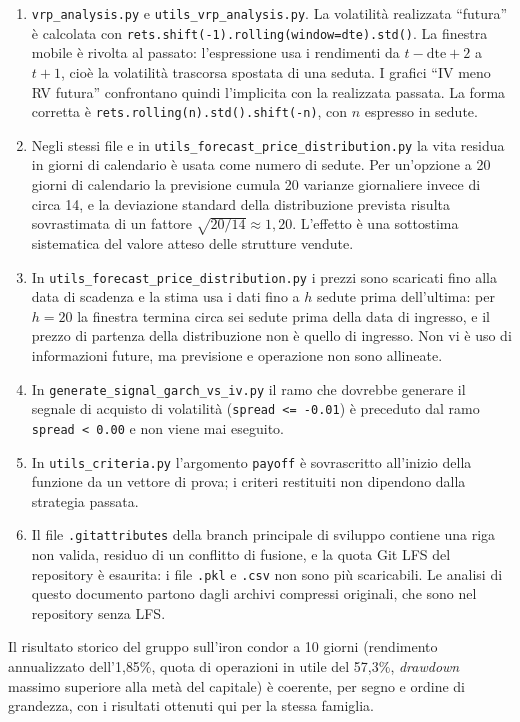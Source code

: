 \documentclass[11pt,a4paper]{article}
\begin{document}
\begin{enumerate}
\item \texttt{vrp\_analysis.py} e \texttt{utils\_vrp\_analysis.py}. La volatilità realizzata ``futura'' è calcolata con \texttt{rets.shift(-1).rolling(window=dte).std()}. La finestra mobile è rivolta al passato: l'espressione usa i rendimenti da $t-\mathrm{dte}+2$ a $t+1$, cioè la volatilità trascorsa spostata di una seduta. I grafici ``IV meno RV futura'' confrontano quindi l'implicita con la realizzata passata. La forma corretta è \texttt{rets.rolling(n).std().shift(-n)}, con $n$ espresso in sedute.
\item Negli stessi file e in \texttt{utils\_forecast\_price\_distribution.py} la vita residua in giorni di calendario è usata come numero di sedute. Per un'opzione a 20 giorni di calendario la previsione cumula 20 varianze giornaliere invece di circa 14, e la deviazione standard della distribuzione prevista risulta sovrastimata di un fattore $\sqrt{20/14}\approx 1{,}20$. L'effetto è una sottostima sistematica del valore atteso delle strutture vendute.
\item In \texttt{utils\_forecast\_price\_distribution.py} i prezzi sono scaricati fino alla data di scadenza e la stima usa i dati fino a $h$ sedute prima dell'ultima: per $h=20$ la finestra termina circa sei sedute prima della data di ingresso, e il prezzo di partenza della distribuzione non è quello di ingresso. Non vi è uso di informazioni future, ma previsione e operazione non sono allineate.
\item In \texttt{generate\_signal\_garch\_vs\_iv.py} il ramo che dovrebbe generare il segnale di acquisto di volatilità (\texttt{spread <= -0.01}) è preceduto dal ramo \texttt{spread < 0.00} e non viene mai eseguito.
\item In \texttt{utils\_criteria.py} l'argomento \texttt{payoff} è sovrascritto all'inizio della funzione da un vettore di prova; i criteri restituiti non dipendono dalla strategia passata.
\item Il file \texttt{.gitattributes} della branch principale di sviluppo contiene una riga non valida, residuo di un conflitto di fusione, e la quota Git LFS del repository è esaurita: i file \texttt{.pkl} e \texttt{.csv} non sono più scaricabili. Le analisi di questo documento partono dagli archivi compressi originali, che sono nel repository senza LFS.
\end{enumerate}

Il risultato storico del gruppo sull'iron condor a 10 giorni (rendimento annualizzato dell'1{,}85\%, quota di operazioni in utile del 57{,}3\%, \emph{drawdown} massimo superiore alla metà del capitale) è coerente, per segno e ordine di grandezza, con i risultati ottenuti qui per la stessa famiglia.
\end{document}
